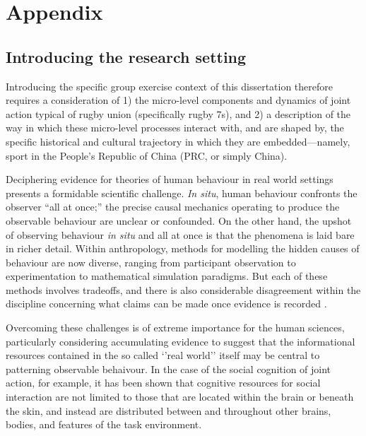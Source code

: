 \chapter{\label{app2:theory}Appendix}

\begin{CJK}{UTF8}{gbsn}





  \section{Introducing the research setting}

Introducing the specific group exercise context of this dissertation therefore requires a consideration of 1) the micro-level components and dynamics of joint action typical of rugby union (specifically rugby 7s), and 2) a description of the way in which these micro-level processes interact with, and are shaped by, the specific historical and cultural trajectory in which they are embedded---namely, sport in the People's Republic of China (PRC, or simply China).


  Deciphering evidence for theories of human behaviour in real world settings presents a formidable scientific challenge.  \textit{In situ}, human behaviour confronts the observer ``all at once;'' the precise causal mechanics operating to produce the observable behaviour are unclear or confounded.  On the other hand, the upshot of observing behaviour \textit{in situ} and all at once is that the phenomena is laid bare in richer detail.  Within anthropology, methods for modelling the hidden causes of behaviour are now diverse, ranging from participant observation to experimentation to mathematical simulation paradigms.   But each of these methods involves tradeoffs, and there is also considerable disagreement within the discipline concerning what claims can be made once evidence is recorded \citep{Whitehouse2012}.

  Overcoming these challenges is of extreme importance for the human sciences, particularly considering accumulating evidence to suggest that the informational resources contained in the so called ‘’real world’’ itself may be central to patterning observable behaivour.  In the case of the social cognition of joint action, for example, it has been shown that cognitive resources for social interaction are not limited to those that are located within the brain or beneath the skin, and instead are distributed between and throughout other brains, bodies, and features of the task environment.



\end{CJK}
